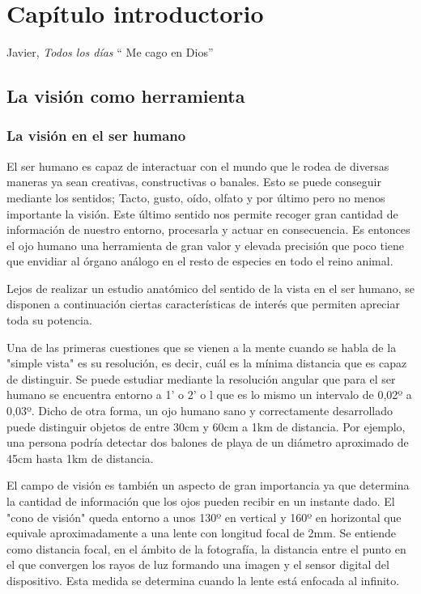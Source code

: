 

\chapter{ Capítulo introductorio}

\begin{chapquote}{Javier, \textit{Todos los días}}
`` Me cago en Dios''
\end{chapquote}

\section{La visión como herramienta}

\subsection{La visión en el ser humano}
El ser humano es capaz de interactuar con el mundo que le rodea de diversas maneras ya sean creativas, constructivas o banales. Esto se puede conseguir mediante los sentidos; Tacto, gusto, oído, olfato y por último pero no menos importante la visión. Este último sentido nos permite recoger gran cantidad de información de nuestro entorno, procesarla y actuar en consecuencia. Es entonces el ojo humano una herramienta de gran valor y elevada precisión que poco tiene que envidiar al órgano análogo en el resto de especies en todo el reino animal. 

Lejos de realizar un estudio anatómico del sentido de la vista en el ser humano, se disponen a continuación ciertas características de interés que permiten apreciar toda su potencia.

Una de las primeras cuestiones que se vienen a la mente cuando se habla de la "simple vista" es su resolución, es decir, cuál es la mínima distancia que es capaz de distinguir. Se puede estudiar mediante la resolución angular que para el ser humano se encuentra entorno a 1' o 2' o l que es lo mismo un intervalo de 0,02º a 0,03º\cite{simple_vista}. Dicho de otra forma, un ojo humano sano y correctamente desarrollado puede distinguir objetos de entre 30cm y 60cm a 1km de distancia. Por ejemplo, una persona podría detectar dos balones de playa de un diámetro aproximado de 45cm hasta 1km de distancia.


El campo de visión es también un aspecto de gran importancia ya que determina la cantidad de información que los ojos pueden recibir en un instante dado. El "cono de visión" queda entorno a unos 130º en vertical y 160º en horizontal que equivale aproximadamente a una lente con longitud focal de 2mm\cite{angle_of_view}. Se entiende como distancia focal, en el ámbito de la fotografía, la distancia entre el punto en el que convergen los rayos de luz formando una imagen y el sensor digital del dispositivo. Esta medida se determina cuando la lente está enfocada al infinito.


